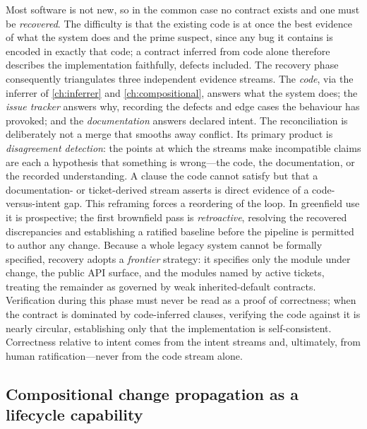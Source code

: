Most software is not new, so in the common case no contract exists and one must be
\emph{recovered}. The difficulty is that the existing code is at once the best
evidence of what the system does and the prime suspect, since any bug it contains
is encoded in exactly that code; a contract inferred from code alone therefore
describes the implementation faithfully, defects included. The recovery phase
consequently triangulates three independent evidence streams. The \emph{code},
via the inferrer of \cref{ch:inferrer} and \cref{ch:compositional}, answers what
the system does; the \emph{issue tracker} answers why, recording the defects and
edge cases the behaviour has provoked; and the \emph{documentation} answers
declared intent. The reconciliation is deliberately not a merge that smooths away
conflict. Its primary product is \emph{disagreement detection}: the points at
which the streams make incompatible claims are each a hypothesis that something is
wrong---the code, the documentation, or the recorded understanding. A clause the
code cannot satisfy but that a documentation- or ticket-derived stream asserts is
direct evidence of a code-versus-intent gap. This reframing forces a reordering of
the loop. In greenfield use it is prospective; the first brownfield pass is
\emph{retroactive}, resolving the recovered discrepancies and establishing a
ratified baseline before the pipeline is permitted to author any change. Because a
whole legacy system cannot be formally specified, recovery adopts a \emph{frontier}
strategy: it specifies only the module under change, the public API surface, and
the modules named by active tickets, treating the remainder as governed by weak
inherited-default contracts. Verification during this phase must never be read as a
proof of correctness; when the contract is dominated by code-inferred clauses,
verifying the code against it is nearly circular, establishing only that the
implementation is self-consistent. Correctness relative to intent comes from the
intent streams and, ultimately, from human ratification---never from the code
stream alone.

\subsection{Compositional change propagation as a lifecycle capability}\label{sec:int-propagation}

